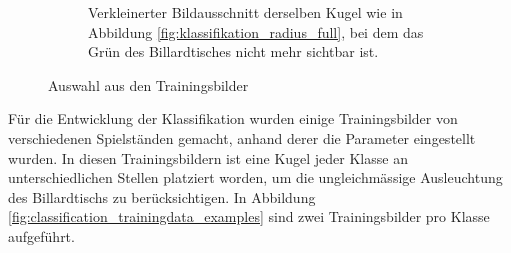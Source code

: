 \begin{figure}[h!]
\begin{subfigure}[t]{0.3\textwidth}
        \caption{
            Verkleinerter Bildausschnitt derselben Kugel wie in Abbildung \ref{fig:klassifikation_radius_full},
            bei dem das Grün des Billardtisches nicht mehr sichtbar ist.
        }
        \label{fig:klassifikation_radius_reduced}
    \end{subfigure}
    \caption{Auswahl aus den Trainingsbilder}
    \label{fig:klassifikation_radius}
\end{figure}

Für die Entwicklung der Klassifikation wurden einige Trainingsbilder von verschiedenen Spielständen gemacht,
anhand derer die Parameter eingestellt wurden.
In diesen Trainingsbildern ist eine Kugel jeder Klasse an unterschiedlichen Stellen platziert worden,
um die ungleichmässige Ausleuchtung des Billardtischs zu berücksichtigen.
In Abbildung \ref{fig:classification_trainingdata_examples} sind zwei Trainingsbilder pro Klasse aufgeführt.

